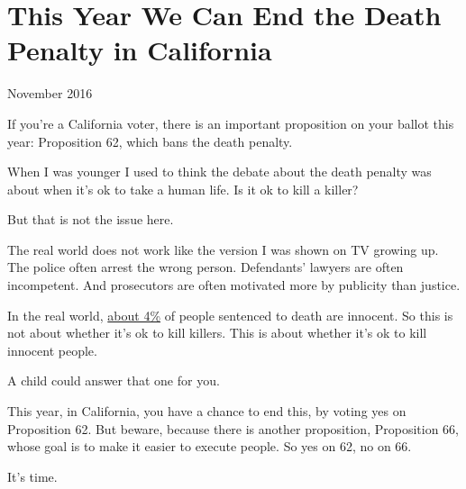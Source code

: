 \chapter{This Year We Can End the Death Penalty in California}

November 2016

If you're a California voter, there is an important proposition on your
ballot this year: Proposition 62, which bans the death penalty.

When I was younger I used to think the debate about the death penalty
was about when it's ok to take a human life. Is it ok to kill a killer?

But that is not the issue here.

The real world does not work like the version I was shown on TV growing
up. The police often arrest the wrong person. Defendants' lawyers are
often incompetent. And prosecutors are often motivated more by publicity
than justice.

In the real world,
\href{http://time.com/79572/more-innocent-people-on-death-row-than-estimated-study/}{about
4\%} of people sentenced to death are innocent. So this is not about
whether it's ok to kill killers. This is about whether it's ok to kill
innocent people.

A child could answer that one for you.

This year, in California, you have a chance to end this, by voting yes
on Proposition 62. But beware, because there is another proposition,
Proposition 66, whose goal is to make it easier to execute people. So
yes on 62, no on 66.

It's time.